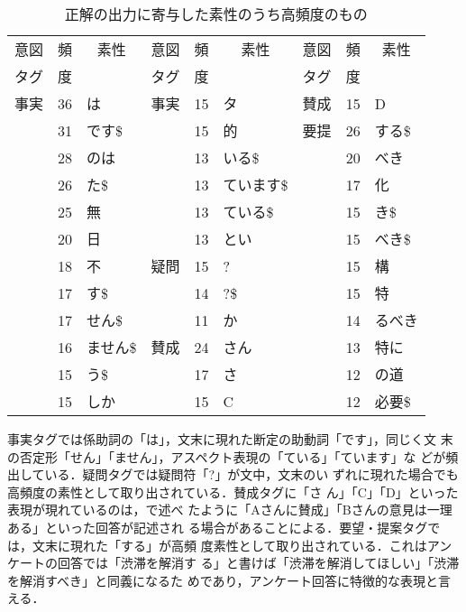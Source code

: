 \begin{table}[t]
\begin{center}
\leavevmode
\caption{正解の出力に寄与した素性のうち高頻度のもの}
\label{tab:effective_feat}
\begin{tabular}{|c|c|l||c|c|l||c|c|l|}
\hline
意図 &頻 &\multicolumn{1}{c||}{素性}
&意図 &頻 &\multicolumn{1}{c||}{素性}
&意図 &頻 &\multicolumn{1}{c|}{素性}
\\
タグ &度 &
&タグ &度 &
&タグ &度 &
\\ \hline \hline
事実 &36 &は       &事実 &15 &タ         &賛成 &15 &D      \\ \cline{2-3}\cline{5-9}
     &31 &です\$   &     &15 &的         &要提 &26 &する\$ \\ \cline{2-3}\cline{5-6}\cline{8-9}
     &28 &のは     &     &13 &いる\$     &     &20 &べき   \\ \cline{2-3}\cline{5-6}\cline{8-9}
     &26 &た\$     &     &13 &ています\$ &     &17 &化     \\ \cline{2-3}\cline{5-6}\cline{8-9}
     &25 &無       &     &13 &ている\$   &     &15 &き\$   \\ \cline{2-3}\cline{5-6}\cline{8-9}
     &20 &日       &     &13 &とい       &     &15 &べき\$ \\ \cline{2-6}\cline{8-9}
     &18 &不       &疑問 &15 &?          &     &15 &構     \\ \cline{2-3}\cline{5-6}\cline{8-9}
     &17 &す\$     &     &14 &?\$        &     &15 &特     \\ \cline{2-3}\cline{5-6}\cline{8-9}
     &17 &せん\$   &     &11 &か         &     &14 &るべき \\ \cline{2-6}\cline{8-9}
     &16 &ません\$ &賛成 &24 &さん     	 &     &13 &特に   \\ \cline{2-3}\cline{5-6}\cline{8-9}
     &15 &う\$     &     &17 &さ     	 &     &12 &の道   \\ \cline{2-3}\cline{5-6}\cline{8-9}
     &15 &しか     &     &15 &C     	 &     &12 &必要\$ \\ \hline
\end{tabular}
\end{center}
\end{table}


事実タグでは係助詞の「は」，文末に現れた断定の助動詞「です」，同じく文
末の否定形「せん」「ません」，アスペクト表現の「ている」「ています」な
どが頻出している．疑問タグでは疑問符「?」が文中，文末のい
ずれに現れた場合でも高頻度の素性として取り出されている．賛成タグに「さ
ん」「C」「D」といった表現が現れているのは，で述べ
たように「Aさんに賛成」「Bさんの意見は一理ある」といった回答が記述され
る場合があることによる．要望・提案タグでは，文末に現れた「する」が高頻
度素性として取り出されている．これはアンケートの回答では「渋滞を解消す
る」と書けば「渋滞を解消してほしい」「渋滞を解消すべき」と同義になるた
めであり，アンケート回答に特徴的な表現と言える．

